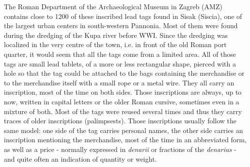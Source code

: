 \documentclass[amsthm,ebook]{saparticle}
\begin{document}
\noindent The Roman Department of the Archaeological Museum in Zagreb (AMZ) contains close to 1200 of these inscribed lead tags
found in Sisak (Siscia), one of the largest urban centers in south-western Pannonia. Most of them were found during the
dredging of the Kupa river before WWI. Since the dredging was localized in the very centre of the town, i.e. in front
of the old Roman port quarter, it would seem that all the tags come from a limited area. All of those tags are small
lead tablets, of a more or less rectangular shape, pierced with a hole so that the tag could be attached to the bags
containing the merchandise or to the merchandise itself with a small rope or a metal wire. They all carry an
inscription, most of the time on both sides. Those inscriptions are always, up to now, written in capital letters or
the older Roman cursive, sometimes even in a mixture of both. Most of the tags were reused several times and thus they
carry traces of older inscriptions (palimpsests). Those inscriptions usually follow the same model: one side of the tag
carries personal names, the other side carries an inscription mentioning the merchandise, most of the time in an
abbreviated form, as well as a price - normally expressed in \emph{denarii} or fractions of the \emph{denarius} - and quite often an
indication of quantity or weight.
\end{document}
